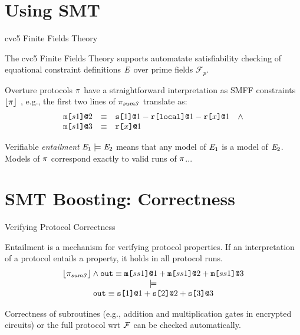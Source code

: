 \documentclass{beamer}
\newcommand{\sumthree}{\prog_{\mathit{sum3}}}
\begin{document}
\section{Using SMT}

\begin{frame}{cvc5 Finite Fields Theory}

  The cvc5 Finite Fields Theory supports automatate satisfiability checking of equational
  constraint definitions $\mathit{E}$ over prime fields $\mathcal{F}_{p}$.

  \medskip
  
  Overture protocols $\pi$ have a straightforward interpretation as SMFF constraints $\lfloor \pi \rfloor$ , e.g.,
  the first two lines of $\pi_{\mathit{sum3}}$ translate as:
  $$
    \begin{array}{lll}
      \texttt{m[}s1\texttt{]}\texttt{@}2 &\equiv& \texttt{s[}1\texttt{]}\texttt{@}1 - \texttt{r[}\mathtt{local}\texttt{]}\texttt{@}1 - \texttt{r[}x\texttt{]}\texttt{@}1\quad \wedge \\ 
      \texttt{m[}s1\texttt{]}\texttt{@}3 &\equiv& \texttt{r[}x\texttt{]}\texttt{@}1 
    \end{array}
 $$

 Verifiable \emph{entailment} $\mathit{E}_1 \models \mathit{E}_2$ means that any model of $\mathit{E}_1$ is a model
 of $\mathit{E}_2$. Models of $\pi$ correspond exactly to valid runs of $\pi$...
  
\end{frame}

\section{SMT Boosting: Correctness}

\begin{frame}{Verifying Protocol Correctness}

  Entailment is a mechanism for verifying protocol properties. If an interpretation
  of a protocol entails a property, it holds in all protocol runs. 
$$
\begin{array}{c}
  \toeq{\sumthree} \wedge \ttt{out} \eop \mx{ss1}{1} + \mx{ss1}{2} + \mx{ss1}{3}\\ \models\\
  \ttt{out} \eop \sx{1}{1} \fplus \sx{2}{2} \fplus \sx{3}{3}
\end{array}
$$

Correctness of subroutines (e.g., addition and multiplication gates in encrypted circuits)
or the full protocol wrt $\mathcal{F}$ can be checked automatically.
\end{frame}
\end{document}
